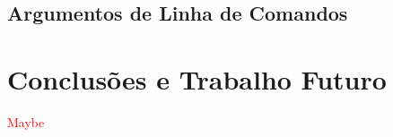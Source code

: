 \documentclass[a4paper,12pt]{scrreprt}
\begin{document}
\section{Argumentos de Linha de Comandos}



\chapter{Conclusões e Trabalho Futuro}
    \textcolor{red}{
        Maybe
    }







\renewcommand{\nomname}{Lista de Siglas e Acrónimos}
\end{document}
